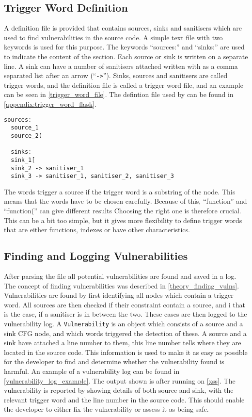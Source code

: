 \subsection{Trigger Word Definition}
A definition file is provided that contains sources, sinks and sanitisers which are used to find vulnerabilities in the source code.
A simple text file with two keywords  is used for this purpose.
The keywords ``sources:'' and ``sinks:'' are used to indicate the content of the section.
Each source or sink is written on a separate line.
A sink can have a number of sanitisers attached written with as a comma separated list after an arrow (``\texttt{->}'').
Sinks, sources and sanitisers are called trigger words, and the definition file is called a trigger word file, and an example can be seen in \cref{trigger_word_file}.
The defintion file used by \pyt{} can be found in \cref{appendix:trigger_word_flask}.
\begin{lstlisting}[style=default, caption={How the trigger word file should be defined.}, label={trigger_word_file}]
  sources:
  source_1
  source_2(

  sinks:
  sink_1[
  sink_2 -> sanitiser_1
  sink_3 -> sanitiser_1, sanitiser_2, sanitiser_3
\end{lstlisting}

The words trigger a source if the trigger word is a substring of the node.
This means that the words have to be chosen carefully.
Because of this, ``function'' and ``function('' can give different results
Choosing the right one is therefore crucial.
This can be a bit too simple, but it gives more flexibility to define trigger words that are either functions, indexes or have other characteristics.

\subsection{Finding and Logging Vulnerabilities}
After parsing the file all potential vulnerabilities are found and saved in a log.
The concept of finding vulnerabilities was described in \cref{theory_finding_vulns}.
Vulnerabilities are found by first identifying all nodes which contain a trigger word.
All sources are then checked if their constraint contain a source, and i that is the case, if a sanitiser is in between the two.
These cases are then logged to the vulnerability log.
A \texttt{Vulnerability} is an object which consists of a source and a sink CFG node, and which words triggered the detection of these.
A source and a sink have attached a line number to them, this line number tells where they are located in the source code.
This information is used to make it as easy as possible for the developer to find and determine whether the vulnerability found is harmful.
An example of a vulnerability log can be found in \cref{vulnerability_log_example}.
The output shown is after running \pyt{} on \cref{xss}.
The vulnerability is reported by showing details of both source and sink, with the relevant trigger word and the line number in the source code.
This should enable the developer to either fix the vulnerability or assess it as being safe.

